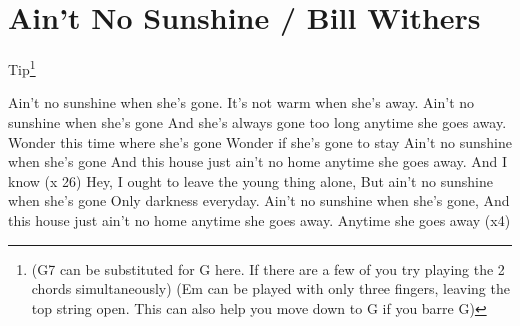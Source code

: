 \section{Ain't No Sunshine / Bill Withers}\label{sec:aint_no_sunshine}
Tip\footnote{(G7 can be substituted for G here. If there are a few of you try playing the 2 chords simultaneously)
(Em can be played with only three fingers, leaving the top string open. This can also help you move
down to G if you barre G)}
\Aminor
\Eminor
\Gmajor
\Dminor

Ain't no sunshine when she's gone. 
It's not warm when she's away. 
Ain't no sunshine when she's gone 
And she's always gone too long anytime she goes away. 
Wonder this time where she's gone 
Wonder if she's gone to stay 
Ain't no sunshine when she's gone 
And this house just ain't no home anytime she goes away.
And I know (x 26)
Hey, I ought to leave the young thing alone, But ain't no sunshine when she's gone
Only darkness everyday.
Ain't no sunshine when she's gone,
And this house just ain't no home anytime she goes away.
Anytime she goes away (x4)
